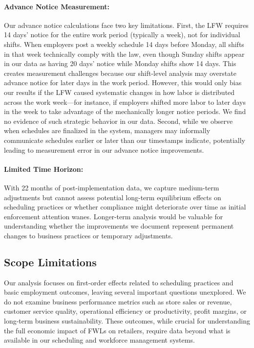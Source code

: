\documentclass[letterpaper,11pt,leqno]{article}
\theoremstyle{paper}
\begin{document}
\paragraph{Advance Notice Measurement:} Our advance notice calculations face two key limitations. First, the LFW requires 14 days' notice for the entire work period (typically a week), not for individual shifts. When employers post a weekly schedule 14 days before Monday, all shifts in that week technically comply with the law, even though Sunday shifts appear in our data as having 20 days' notice while Monday shifts show 14 days. This creates measurement challenges because our shift-level analysis may overstate advance notice for later days in the work period. However, this would only bias our results if the LFW caused systematic changes in how labor is distributed across the work week—for instance, if employers shifted more labor to later days in the week to take advantage of the mechanically longer notice periods. We find no evidence of such strategic behavior in our data. Second, while we observe when schedules are finalized in the system, managers may informally communicate schedules earlier or later than our timestamps indicate, potentially leading to measurement error in our advance notice improvements.

\paragraph{Limited Time Horizon:} With 22 months of post-implementation data, we capture medium-term adjustments but cannot assess potential long-term equilibrium effects on scheduling practices or whether compliance might deteriorate over time as initial enforcement attention wanes. Longer-term analysis would be valuable for understanding whether the improvements we document represent permanent changes to business practices or temporary adjustments.


\subsection{Scope Limitations}

Our analysis focuses on first-order effects related to scheduling practices and basic employment outcomes, leaving several important questions unexplored. We do not examine business performance metrics such as store sales or revenue, customer service quality, operational efficiency or productivity, profit margins, or long-term business sustainability. These outcomes, while crucial for understanding the full economic impact of FWLs on retailers, require data beyond what is available in our scheduling and workforce management systems.
\end{document}

